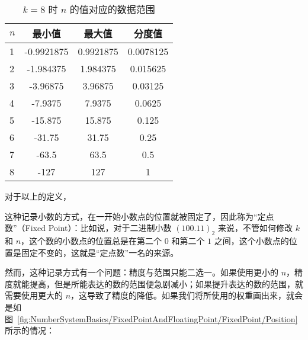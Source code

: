         \begin{table}
            \centering
            \begin{tabular}{lS[table-format=-3.7]S[table-format=-3.7]S[table-format=-3.7]}
                $n$ & 最小值     & 最大值    & 分度值    \\    & -0.9921875 & 0.9921875  & 0.0078125 \\
                2   & -1.984375  & 1.984375   & 0.015625  \\
                3   & -3.96875   & 3.96875    & 0.03125   \\
                4   & -7.9375    & 7.9375     & 0.0625    \\
                5   & -15.875    & 15.875     & 0.125     \\
                6   & -31.75     & 31.75      & 0.25      \\
                7   & -63.5      & 63.5       & 0.5       \\
                8   & -127       & 127        & 1         \\
            \end{tabular}
            \caption{$k = 8$ 时 $n$ 的值对应的数据范围}
            \label{tab:NumberSystemBasics/FixedPointAndFloatingPoint/FixedPoint/DataRange}
        \end{table}

        对于以上的定义，

        这种记录小数的方式，在一开始小数点的位置就被固定了，因此称为“定点数”（Fixed Point）：比如说，对于二进制小数 $(100.11)_2$ 来说，不管如何修改 $k$ 和 $n$，这个数的小数点的位置总是在第二个 $0$ 和第二个 $1$ 之间，这个小数点的位置是固定不变的，这就是“定点数”一名的来源。

        然而，这种记录方式有一个问题：精度与范围只能二选一。如果使用更小的 $n$，精度就能提高，但是所能表达的数的范围便急剧减小；如果提升表达的数的范围，就需要使用更大的 $n$，这导致了精度的降低。如果我们将所使用的权重画出来，就会是如图~\ref{fig:NumberSystemBasics/FixedPointAndFloatingPoint/FixedPoint/Position} 所示的情况：

